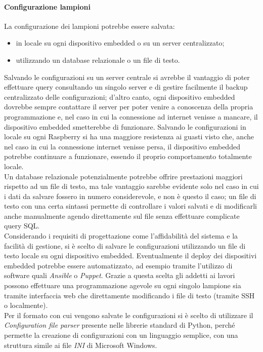 \paragraph{Configurazione lampioni}
La configurazione dei lampioni potrebbe essere salvata:
\begin{itemize}
 \item in locale su ogni dispositivo embedded o su un server centralizzato;
 \item utilizzando un database relazionale o un file di testo.
\end{itemize}
Salvando le configurazioni su un server centrale si avrebbe il vantaggio di poter effettuare query consultando un singolo server e di gestire facilmente il backup centralizzato delle configurazioni;
d'altro canto, ogni dispositivo embedded dovrebbe sempre contattare il server per poter venire a conoscenza della propria programmazione e, nel caso in cui la connessione ad internet venisse a mancare, il dispositivo embedded smetterebbe di funzionare.
Salvando le configurazioni in locale su ogni Raspberry si ha una maggiore resistenza ai guasti visto che, anche nel caso in cui la connessione internet venisse persa, il dispositivo embedded potrebbe continuare a funzionare, essendo il proprio comportamento totalmente locale.
\\Un database relazionale potenzialmente potrebbe offrire prestazioni maggiori rispetto ad un file di testo, ma tale vantaggio sarebbe evidente solo nel caso in cui i dati da salvare fossero in numero considerevole, e non è questo il caso;
un file di testo con una certa sintassi permette di controllare i valori salvati e di modificarli anche manualmente agendo direttamente sul file senza effettuare complicate query SQL.
\\Considerando i requisiti di progettazione come l'affidabilità del sistema e la facilità di gestione, si è scelto di salvare le configurazioni utilizzando un file di testo locale su ogni dispositivo embedded.
Eventualmente il deploy dei dispositivi embedded potrebbe essere automatizzato, ad esempio tramite l'utilizzo di software quali \textit{Ansible} o \textit{Puppet}.
Grazie a questa scelta gli addetti ai lavori possono effettuare una programmazione agevole su ogni singolo lampione sia tramite interfaccia web che direttamente modificando i file di testo (tramite SSH o localmente).
\\Per il formato con cui vengono salvate le configurazioni si è scelto di utilizzare il \textit{Configuration file parser} presente nelle librerie standard di Python, perché permette la creazione di configurazioni con un linguaggio semplice, con una struttura simile ai file \textit{INI} di Microsoft Windows.
